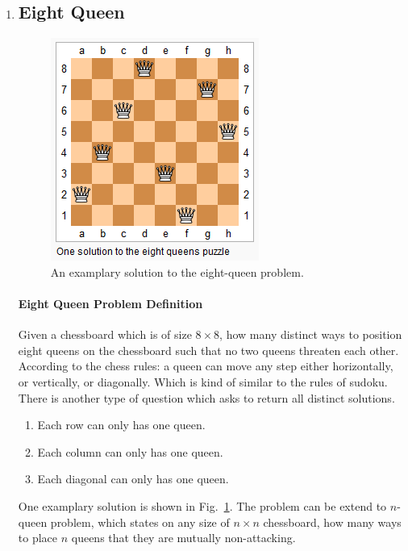 \documentclass[../main.tex]{subfiles}
\begin{document}
\begin{enumerate}
\item %
\subsection{Eight Queen}
\begin{figure}[!ht]
    \centering
    \includegraphics[width=0.6\columnwidth]{fig/8-queens.png}
    \caption{An examplary solution to the eight-queen problem.}
    \label{fig:solution_eight_queen}
\end{figure}
\paragraph{Eight Queen Problem  Definition}
Given a chessboard which is of size $8\times 8$, how many distinct ways to position eight queens on the chessboard such that no two queens threaten each other. According to the chess rules: a queen can move any step either horizontally, or vertically, or diagonally. Which is kind of similar to the rules of sudoku. There is another type of question which asks to return all distinct solutions. 
\begin{enumerate}
    \item Each row can only has one queen.
    \item Each column can only has one queen.
    \item Each diagonal can only has one queen.
\end{enumerate}
One examplary solution is shown in Fig.~\ref{fig:solution_eight_queen}. The problem can be extend to $n$-queen problem, which states on any size of $n\times n$ chessboard, how many ways to place $n$ queens that they are mutually non-attacking.  


\end{enumerate}
\end{document}
